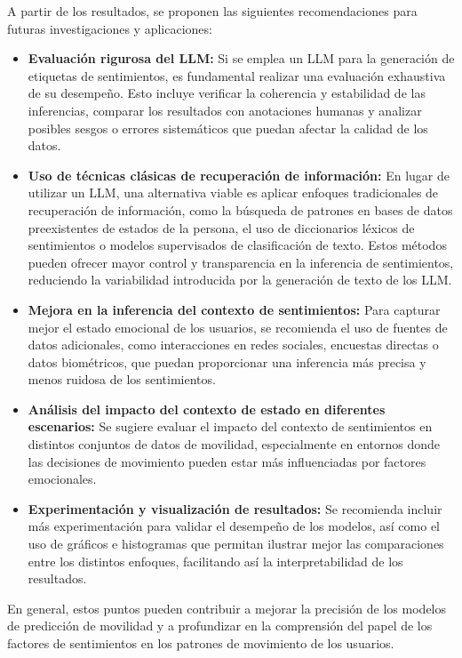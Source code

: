 \begin{recomendations}
    A partir de los resultados, se proponen las siguientes 
    recomendaciones para futuras investigaciones y aplicaciones:

\begin{itemize}

    \item \textbf{Evaluación rigurosa del LLM:} Si se emplea un LLM para 
    la generación de etiquetas de sentimientos, es fundamental realizar 
    una evaluación exhaustiva de su desempeño. Esto incluye verificar 
    la coherencia y estabilidad de las inferencias, comparar los 
    resultados con anotaciones humanas y analizar posibles sesgos o 
    errores sistemáticos que puedan afectar la calidad de los datos.
    
    \item \textbf{Uso de técnicas clásicas de recuperación de información:} 
    En lugar de utilizar un 
    LLM, una alternativa viable es aplicar enfoques tradicionales de 
    recuperación de información, como la búsqueda de patrones en 
    bases de datos preexistentes de estados de la persona, el uso de 
    diccionarios léxicos de sentimientos o modelos supervisados de 
    clasificación de texto. 
    Estos métodos pueden ofrecer mayor control y transparencia en 
    la inferencia de sentimientos, reduciendo la variabilidad 
    introducida por la generación de texto de los LLM.

   

    \item \textbf{Mejora en la inferencia del contexto de sentimientos:} 
    Para capturar mejor el estado emocional de los usuarios, se recomienda 
    el uso de fuentes de datos adicionales, como interacciones en redes 
    sociales, encuestas directas o datos biométricos, que puedan 
    proporcionar una inferencia más precisa y menos ruidosa de los 
    sentimientos.
    
    \item \textbf{Análisis del impacto del contexto de estado en 
    diferentes escenarios:} Se sugiere evaluar el impacto del contexto 
    de sentimientos en distintos conjuntos de datos de movilidad, 
    especialmente en entornos donde las decisiones de movimiento pueden 
    estar más influenciadas por factores emocionales.
    
    \item \textbf{Experimentación y visualización de resultados:}  
    Se recomienda incluir más experimentación para validar el desempeño 
    de los modelos, así como el uso de gráficos e histogramas que 
    permitan ilustrar mejor las comparaciones entre los distintos enfoques,  
    facilitando as\'i la interpretabilidad de los resultados.
\end{itemize}

En general, estos puntos pueden contribuir a mejorar la precisión de 
los modelos de predicción de movilidad y a profundizar en la 
comprensión del papel de los factores de sentimientos en los patrones 
de movimiento de los usuarios.

\end{recomendations}
